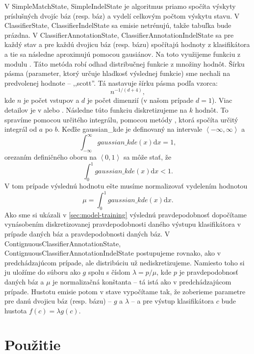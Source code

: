 V SimpleMatchState, SimpleIndelState je algoritmus priamo spočíta výskyty príslušných dvojíc báz (resp. báz) a vydelí celkovým počtom výskytu stavu.
V ClassifierState, ClassifierIndelState sa emisie netrénujú, takže tabuľka bude prázdna.
V ClassifierAnnotationState, ClassifierAnnotationIndelState sa pre každý stav a pre každú dvojicu báz (resp. bázu) spočítajú hodnoty z klasifikátora a tie sa následne aproximujú pomocou gausiánov. Na toto využijeme funkciu  z modulu . Táto metóda robí odhad distribučnej funkcie z množiny hodnôt. Šírku pásma (parameter, ktorý určuje hladkosť výslednej funkcie) sme nechali na predvolenej hodnote -- ,,scott''. Tá nastavuje šírku pásma podľa vzorca:
$$n^{-1/(d+4)},$$
kde $n$ je počet vstupov a $d$ je počet dimenzií (v našom prípade $d = 1$). Viac detailov je v \cite{scipydoc} alebo \cite{wiki:kde}. Následne túto funkciu diskretizujeme na $k$ hodnôt. To spravíme pomocou určitého integrálu, pomocou metódy , ktorá spočíta určitý integrál od $a$ po $b$.
Keďže gaussian\_kde je definovaný na intervale $\left<-\infty, \infty \right>$ a $$\int_{-\infty}^\infty \! gaussian\_kde(x) \mathrm{d}x = 1,$$ orezaním definičného oboru na $\left<0,1\right>$ sa môže stať, že $$\int_0^1 \! gaussian\_kde(x) \mathrm{d}x < 1.$$ V tom prípade výslednú hodnotu ešte musíme normalizovať vydelením hodnotou $$\mu = \int_0^1 \! gaussian\_kde(x) \mathrm{d}x.$$ Ako sme si ukázali v \ref{sec:model-training} výslednú pravdepodobnosť dopočítame vynásobením diskretizovanej pravdepodobnosti daného výstupu klasifikátora v prípade daných báz a pravdepodobnosti daných báz.
V ContignuousClassifierAnnotationState, ContignuousClassifierAnnotationIndelState postupujeme rovnako, ako v predchádzajúcom prípade, ale distribúciu už nediskretizujeme. Namiesto toho si ju uložíme do súboru ako $g$ spolu s číslom $\lambda = p/\mu$, kde $p$ je pravdepodobnosť daných báz a $\mu$ je normalizačná konštanta -- tá istá ako v predchádzajúcom prípade. Hustotu emisie potom v stave vypočítame tak, že zoberieme parametre pre danú dvojicu báz (resp. bázu) -- $g$ a $\lambda$ -- a pre výstup klasifikátora $c$ bude hustota $f(c) = \lambda g(c).$

\section{Použitie}

